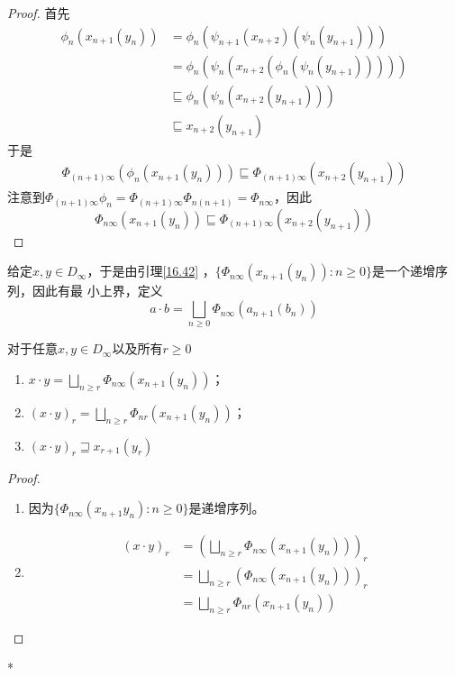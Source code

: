 \documentclass[11pt]{article}
\begin{document}
\begin{proof}
首先
\begin{align*}
\phi_n(x_{n+1}(y_n))&=\phi_n(\psi_{n+1}(x_{n+2})(\psi_{n}(y_{n+1})))\\
&=\phi_n(\psi_n(x_{n+2}(\phi_n(\psi_n(y_{n+1})))))\\
&\sqsubseteq\phi_n(\psi_n(x_{n+2}(y_{n+1})))\\
&\sqsubseteq x_{n+2}(y_{n+1})
\end{align*}
于是
\begin{align*}
\Phi_{(n+1)\infty}(\phi_n(x_{n+1}(y_n)))\sqsubseteq\Phi_{(n+1)\infty}(x_{n+2}(y_{n+1}))
\end{align*}
注意到\(\Phi_{(n+1)\infty}\phi_n=\Phi_{(n+1)\infty}\Phi_{n(n+1)}=\Phi_{n\infty}\)，因此
\begin{equation*}
\Phi_{n\infty}(x_{n+1}(y_n))\sqsubseteq\Phi_{(n+1)\infty}(x_{n+2}(y_{n+1}))
\end{equation*}
\end{proof}

\begin{definition}[]
给定\(x,y\in D_\infty\)，于是由引理\ref{16.42} ，\(\{\Phi_{n\infty}(x_{n+1}(y_n)):n\ge 0\}\)是一个递增序列，因此有最
小上界，定义
\begin{equation*}
a\cdot b=\bigsqcup_{n\ge 0}\Phi_{n\infty}(a_{n+1}(b_n))
\end{equation*}
\end{definition}


\begin{corollary}[]
对于任意\(x,y\in D_\infty\)以及所有\(r\ge 0\)
\begin{enumerate}
\item \(x\cdot y=\bigsqcup_{n\ge r}\Phi_{n\infty}(x_{n+1}(y_n))\)；
\item \((x\cdot y)_r=\bigsqcup_{n\ge r}\Phi_{nr}(x_{n+1}(y_n))\)；
\item \((x\cdot y)_r\sqsupseteq x_{r+1}(y_r)\)
\end{enumerate}
\end{corollary}

\begin{proof}
\begin{enumerate}
\item 因为\(\{\Phi_{n\infty}(x_{n+1}y_n): n\ge 0\}\)是递增序列。
\item \begin{align*}
(x\cdot y)_r&=\left( \bigsqcup_{n\ge r}\Phi_{n\infty}(x_{n+1}(y_n)) \right)_r\\
&=\bigsqcup_{n\ge r}(\Phi_{n\infty}(x_{n+1}(y_n)))_r\\
&=\bigsqcup_{n\ge r}\Phi_{nr}(x_{n+1}(y_n))
\end{align*}
\end{enumerate}
\end{proof}
*
\end{document}
